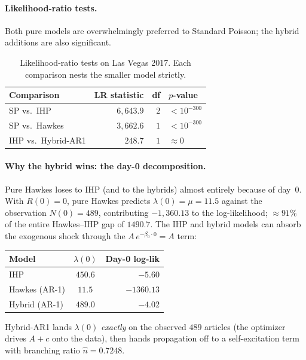 \documentclass[11pt]{article}
\begin{document}
\paragraph{Likelihood-ratio tests.} Both pure models are overwhelmingly
preferred to Standard Poisson; the hybrid additions are also significant.

\begin{table}[H]
\centering
\caption{Likelihood-ratio tests on Las Vegas 2017. Each comparison nests
the smaller model strictly.}
\label{tab:partA-LRT}
\begin{tabular}{lrrl}
\toprule
Comparison & LR statistic & df & $p$-value \\
\midrule
SP vs.\ IHP                  & $6{,}643.9$ & $2$ & $<10^{-300}$ \\
SP vs.\ Hawkes               & $3{,}662.6$ & $1$ & $<10^{-300}$ \\
IHP vs.\ Hybrid-AR1          & $248.7$     & $1$ & $\approx 0$  \\
\bottomrule
\end{tabular}
\end{table}

\paragraph{Why the hybrid wins: the day-0 decomposition.}
Pure Hawkes loses to IHP (and to the hybrids) almost entirely because of
day~0. With $R(0)=0$, pure Hawkes predicts
$\lambda(0)=\mu=11.5$ against the observation $N(0)=489$, contributing
$-1{,}360.13$ to the log-likelihood; $\approx 91\%$ of the entire
Hawkes--IHP gap of $1490.7$. The IHP and hybrid models can absorb the
exogenous shock through the $A\,e^{-\beta_0\cdot 0}=A$ term:
\begin{center}
\begin{tabular}{lcr}
\toprule
Model & $\lambda(0)$ & Day-0 log-lik \\
\midrule
IHP                    & $450.6$ & $-5.60$    \\
Hawkes (AR-1)          & $11.5$  & $-1360.13$ \\
Hybrid (AR-1)          & $489.0$ & $-4.02$    \\
\bottomrule
\end{tabular}
\end{center}
Hybrid-AR1 lands $\lambda(0)$ \emph{exactly} on the observed $489$ articles
(the optimizer drives $A+c$ onto the data), then hands propagation off to a
self-excitation term with branching ratio $\hat n=0.7248$.
\end{document}
